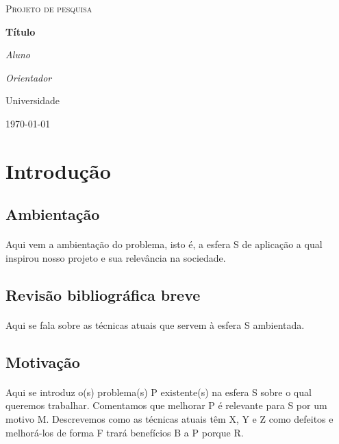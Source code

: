 \documentclass[11pt]{report}
\begin{document}
\begin{titlepage}
	\centering
	{\scshape\Large Projeto de pesquisa\par}
	\vspace{1.5cm}
	{\huge\bfseries Título\par}
	\vspace{2cm}
	{\Large\itshape Aluno\par}
	{\Large\itshape Orientador\par}
	\vfill
	Universidade 
	\vfill
	{\large \today\par}
\end{titlepage}

\newpage

\section{Introdução}

\subsection{Ambientação}
\paragraph{}
Aqui vem a ambientação do problema, isto é, a esfera S de aplicação
a qual inspirou nosso projeto e sua relevância na sociedade.

\subsection{Revisão bibliográfica breve}
\paragraph{}
Aqui se fala sobre as técnicas atuais que servem à esfera S ambientada.

\subsection{Motivação}
\paragraph{}
Aqui se introduz o(s) problema(s) P existente(s) na esfera S sobre o qual 
queremos trabalhar. 
Comentamos que melhorar P é relevante para S por um motivo M.
Descrevemos como as técnicas atuais têm X, Y e Z como defeitos e
melhorá-los de forma F trará benefícios B a P porque R.
\end{document}
